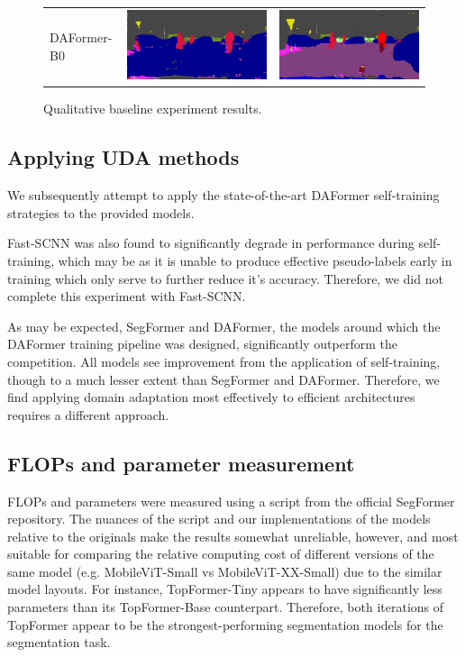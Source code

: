 \documentclass[a4paper,12pt]{report}
\begin{document}
\begin{figure}[]
\begin{tabular}{lll}
        DAFormer-B0        & \includegraphics[width=.3\linewidth,valign=m]{res/lightweight-uda-baseline-qualitative/daformer-mitb0-sourceonly.png}     & \includegraphics[width=.3\linewidth,valign=m]{res/lightweight-uda-baseline-qualitative/daformer-mitb0-selftraining.png}     \\
    \end{tabular}
    \caption{Qualitative baseline experiment results.}
    \label{fig: lightweight-model-baseline}
\end{figure}

\subsection{Applying UDA methods}
We subsequently attempt to apply the state-of-the-art DAFormer self-training strategies to the provided models.

Fast-SCNN was also found to significantly degrade in performance during self-training, which may be as it is unable to produce effective pseudo-labels early in training which only serve to further reduce it's accuracy. Therefore, we did not complete this experiment with Fast-SCNN.

As may be expected, SegFormer and DAFormer, the models around which the DAFormer training pipeline was designed, significantly outperform the competition. All models see improvement from the application of self-training, though to a much lesser extent than SegFormer and DAFormer. Therefore, we find applying domain adaptation most effectively to efficient architectures requires a different approach.

\subsection{FLOPs and parameter measurement}

FLOPs and parameters were measured using a script from the official SegFormer repository. The nuances of the script and our implementations of the models relative to the originals make the results somewhat unreliable, however, and most suitable for comparing the relative computing cost of different versions of the same model (e.g. MobileViT-Small vs MobileViT-XX-Small) due to the similar model layouts. For instance, TopFormer-Tiny appears to have significantly less parameters than its TopFormer-Base counterpart. Therefore, both iterations of TopFormer appear to be the strongest-performing segmentation models for the segmentation task.
\end{document}
